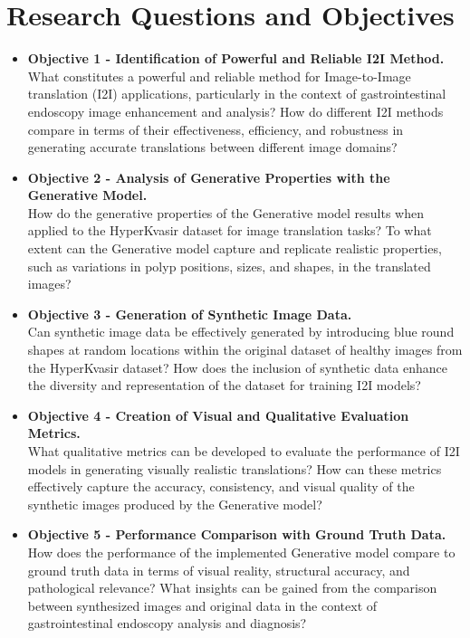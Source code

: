 \documentclass[UKenglish,12pt]{master-style}
\begin{document}
\section{Research Questions and Objectives}

\begin{itemize}
\item \textbf{Objective 1 - Identification of Powerful and Reliable I2I Method. }\\
What constitutes a powerful and reliable method for Image-to-Image translation (I2I) applications, particularly in the context of gastrointestinal endoscopy image enhancement and analysis? How do different I2I methods compare in terms of their effectiveness, efficiency, and robustness in generating accurate translations between different image domains?

\item \textbf{Objective 2 - Analysis of Generative Properties with the Generative Model.}\\
How do the generative properties of the Generative model results when applied to the HyperKvasir dataset for image translation tasks?
To what extent can the Generative model capture and replicate realistic properties, such as variations in polyp positions, sizes, and shapes, in the translated images?

\item \textbf{Objective 3 - Generation of Synthetic Image Data.}\\
Can synthetic image data be effectively generated by introducing blue round shapes at random locations within the original dataset of healthy images from the HyperKvasir dataset? How does the inclusion of synthetic data enhance the diversity and representation of the dataset for training I2I models?

\item \textbf{Objective 4 - Creation of Visual and Qualitative Evaluation Metrics.}\\
What qualitative metrics can be developed to evaluate the performance of I2I models in generating visually realistic translations? How can these metrics effectively capture the accuracy, consistency, and visual quality of the synthetic images produced by the Generative model?

\item \textbf{Objective 5 - Performance Comparison with Ground Truth Data.}\\
How does the performance of the implemented Generative model compare to ground truth data in terms of visual reality, structural accuracy, and pathological relevance? What insights can be gained from the comparison between synthesized images and original data in the context of gastrointestinal endoscopy analysis and diagnosis?

\end{itemize}
\end{document}
